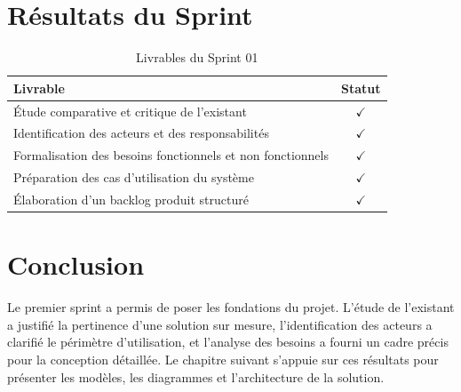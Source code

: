 \section{Résultats du Sprint}
\begin{table}[H]
\centering
\caption{Livrables du Sprint 01}
\label{tab:livrables_s1}
\begin{tabularx}{\textwidth}{|X|c|}
\hline
\textbf{Livrable} & \textbf{Statut} \\
\hline
Étude comparative et critique de l'existant & $\checkmark$ \\
\hline
Identification des acteurs et des responsabilités & $\checkmark$ \\
\hline
Formalisation des besoins fonctionnels et non fonctionnels & $\checkmark$ \\
\hline
Préparation des cas d'utilisation du système & $\checkmark$ \\
\hline
Élaboration d'un backlog produit structuré & $\checkmark$ \\
\hline
\end{tabularx}
\end{table}

\section{Conclusion}
Le premier sprint a permis de poser les fondations du projet. L'étude de l'existant a justifié la pertinence d'une solution sur mesure, l'identification des acteurs a clarifié le périmètre d'utilisation, et l'analyse des besoins a fourni un cadre précis pour la conception détaillée. Le chapitre suivant s'appuie sur ces résultats pour présenter les modèles, les diagrammes et l'architecture de la solution.
